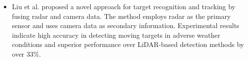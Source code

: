 \documentclass[rnd]{mas_proposal}
\begin{document}
\begin{itemize}
      \item Liu et al. \cite{liu2021robust} proposed a novel approach for target recognition and tracking by fusing radar and camera data. The method employs radar as the primary sensor and uses camera data as secondary information. Experimental results indicate high accuracy in detecting moving targets in adverse weather conditions and superior performance over LiDAR-based detection methods by over 33\%.


\end{itemize}
\end{document}
